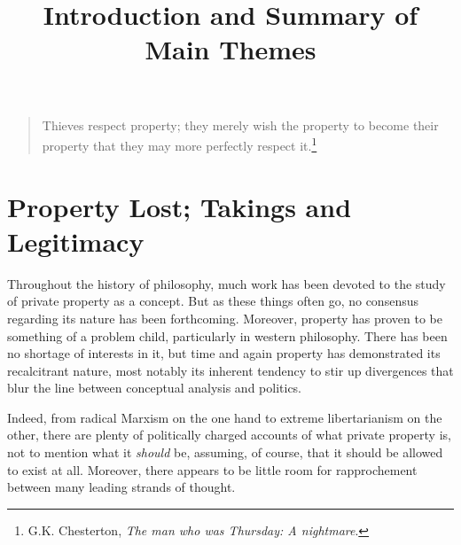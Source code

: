 \documentclass{article} %
\title{Introduction and Summary of Main Themes}\label{chap:intro}
\newcommand{\noo}[1]{}
\begin{document}
\begin{quote}
Thieves respect property; they merely wish the property to become their property that they may more perfectly respect it.\footnote{G.K. Chesterton, {\it The man who was Thursday: A nightmare}.}
\end{quote}
%
%
%
%
\section{Property Lost; Takings and Legitimacy}

Throughout the history of philosophy, much work has been devoted to the study of private property as a concept. But as these things often go, no consensus regarding its nature has been forthcoming. Moreover, property has proven to be something of a problem child, particularly in western philosophy. There has been no shortage of interests in it, but time and again property has demonstrated its recalcitrant nature, most notably its inherent tendency to stir up divergences that blur the line between conceptual analysis and politics. \noo{This might not be a problem in itself, depending on one's methodological stance, but in practice it has had an unfortunate tendency to disrupt attempts at conducting a principled and inclusive academic debate.}

Indeed, from radical Marxism on the one hand to extreme libertarianism on the other, there are plenty of politically charged accounts of what private property is, not to mention what it {\it should} be, assuming, of course, that it should be allowed to exist at all.
Moreover, there appears to be little room for rapprochement between many leading strands of thought. %
\end{document}
